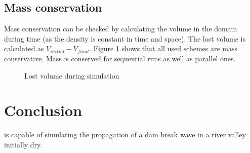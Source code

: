 \subsection{Mass conservation}

Mass conservation can be checked by calculating the volume in the domain during
time (as the density is constant in time and space).
The lost volume is calculated as $V_{initial} - V_{final}$.
Figure \ref{fig:malpasset:lostvol} shows that all used schemes are mass
conservative.
Mass is conserved for sequential runs as well as parallel ones.

\begin{figure}[H]
\centering
{}
\caption{Lost volume during simulation}
\label{fig:malpasset:lostvol}
\end{figure}

\section{Conclusion}
 is capable of simulating the propagation of a dam break wave in a
river valley initially dry.

